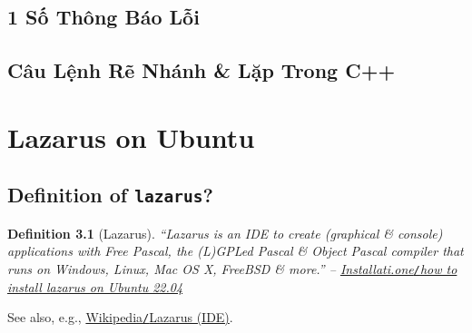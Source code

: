 \documentclass[oneside]{book}
\numberwithin{equation}{section}
\newtheorem{definition}{Definition}[section]
\begin{document}
\section{1 Số Thông Báo Lỗi}


\section{Câu Lệnh Rẽ Nhánh \& Lặp Trong C++}


\chapter{Lazarus on Ubuntu}

\section{Definition of \texttt{lazarus}?}

\begin{definition}[Lazarus]
	``\emph{Lazarus} is an IDE to create (graphical \& console) applications with Free Pascal, the (L)GPLed Pascal \& Object Pascal compiler that runs on Windows, Linux, Mac OS X, FreeBSD \& more.'' -- \href{https://installati.one/ubuntu/22.04/lazarus/}{Installati.one\emph{\texttt{/}}how to install lazarus on Ubuntu 22.04}
\end{definition}
See also, e.g., \href{https://vi.wikipedia.org/wiki/Lazarus_(IDE)}{Wikipedia\texttt{/}Lazarus (IDE)}.


\printbibliography[heading=bibintoc]
	
\end{document}
